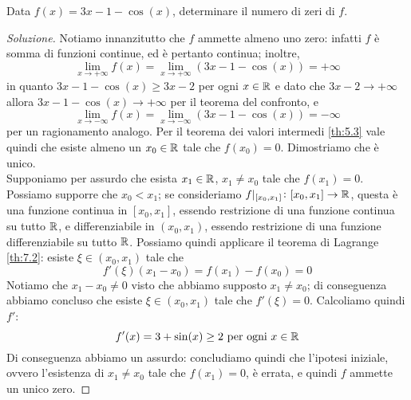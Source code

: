 \begin{exercise}
    \label{ex:7.2}
    Data $f(x) = 3x-1-\cos(x)$, determinare il numero di zeri di $f$.
\end{exercise}
\begin{proof}[Soluzione]
    Notiamo innanzitutto che $f$ ammette almeno uno zero: infatti $f$ è somma di funzioni continue, ed è pertanto continua; inoltre,
    \[
    \lim_{x\to+\infty}f(x) = \lim_{x\to +\infty}(3x-1-\cos(x)) = +\infty 
    \]
    in quanto $3x-1-\cos(x)\ge 3x-2$ per ogni $x\in \amsbb{R}$ e dato che $3x-2\to +\infty$ allora $3x-1-\cos(x)\to+\infty$ per il teorema del confronto, e
    \[
    \lim_{x\to-\infty}f(x) = \lim_{x\to -\infty}(3x-1-\cos(x)) = -\infty 
    \]
    per un ragionamento analogo. Per il teorema dei valori intermedi \ref{th:5.3} vale quindi che esiste almeno un $x_0\in\amsbb{R}$ tale che $f(x_0) = 0$. Dimostriamo che è unico.\\
    Supponiamo per assurdo che esista $x_1\in\amsbb{R}$, $x_1 \ne x_0$ tale che $f(x_1)=0$. Possiamo supporre che $x_0<x_1$; se consideriamo $f|_{[x_0, x_1]}\colon [x_0, x_1]\to\amsbb{R}$, questa è una funzione continua in $[x_0, x_1]$, essendo restrizione di una funzione continua su tutto $\amsbb{R}$, e differenziabile in $(x_0, x_1)$, essendo restrizione di una funzione differenziabile su tutto $\amsbb{R}$. Possiamo quindi applicare il teorema di Lagrange \ref{th:7.2}: esiste $\xi\in(x_0, x_1)$ tale che
    \[
    f'(\xi)(x_1 - x_0) = f(x_1)-f(x_0) = 0
    \]
    Notiamo che $x_1-x_0\ne0$ visto che abbiamo supposto $x_1 \ne x_0$; di conseguenza abbiamo concluso che esiste $\xi\in(x_0, x_1)$ tale che $f'(\xi) = 0$. Calcoliamo quindi $f'$:
    \[
    f'(x) = 3+\sin(x) \ge 2 \ \text{per ogni} \ x\in\amsbb{R}
    \]
    Di conseguenza abbiamo un assurdo: concludiamo quindi che l'ipotesi iniziale, ovvero l'esistenza di $x_1\ne x_0$ tale che $f(x_1)=0$, è errata, e quindi $f$ ammette un unico zero.
\end{proof}

